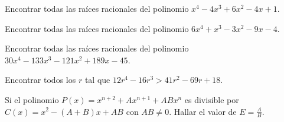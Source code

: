 \showLine
\begin{multicols}{2}
    \begin{problem}
        Encontrar todas las raíces racionales del polinomio $x^4 - 4x^3 + 6x^2 - 4x + 1$.
    \end{problem}

    \begin{problem}
        Encontrar todas las raíces racionales del polinomio $6x^4 + x^3 - 3x^2 - 9x - 4$.
    \end{problem}

    \begin{problem}
        Encontrar todas las raíces racionales del polinomio $30x^4 - 133 x^3 - 121x^2 + 189x - 45$.
    \end{problem}

    \begin{problem}
        Encontrar todos los $r$ tal que $12r^4 - 16r^3 > 41r^2 - 69r + 18$.
    \end{problem}

    \begin{problem}
        Si el polinomio $P(x) = x^{n + 2} + Ax^{n + 1} + ABx^n$ es divisible por $C(x) = x^2 - (A + B)x + AB$ con $AB \neq 0$.
        Hallar el valor de $E = \frac{A}{B}$.
    \end{problem}
\end{multicols}